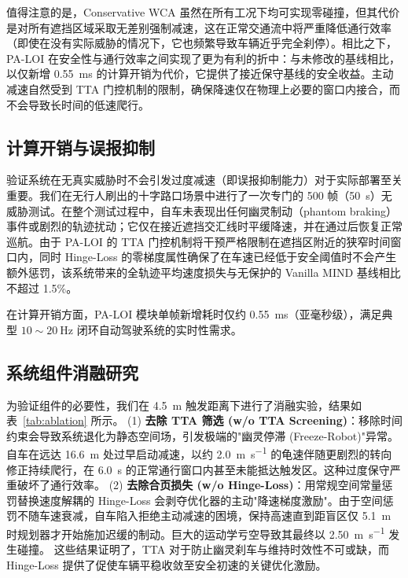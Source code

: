 \documentclass[conference]{IEEEtran}
\begin{document}
值得注意的是，Conservative WCA 虽然在所有工况下均可实现零碰撞，但其代价是对所有遮挡区域采取无差别强制减速，这在正常交通流中将严重降低通行效率（即使在没有实际威胁的情况下，它也频繁导致车辆近乎完全刹停）。相比之下，PA-LOI 在安全性与通行效率之间实现了更为有利的折中：与未修改的基线相比，以仅新增 \SI{0.55}{\milli\second} 的计算开销为代价，它提供了接近保守基线的安全收益。主动减速自然受到 TTA 门控机制的限制，确保降速仅在物理上必要的窗口内接合，而不会导致长时间的低速爬行。



\subsection{计算开销与误报抑制}
验证系统在无真实威胁时不会引发过度减速（即误报抑制能力）对于实际部署至关重要。我们在无行人刷出的十字路口场景中进行了一次专门的 500 帧（\SI{50}{\second}）无威胁测试。在整个测试过程中，自车未表现出任何幽灵制动（phantom braking）事件或剧烈的轨迹扰动；它仅在接近遮挡交汇线时平缓降速，并在通过后恢复正常巡航。由于 PA-LOI 的 TTA 门控机制将干预严格限制在遮挡区附近的狭窄时间窗口内，同时 Hinge-Loss 的零梯度属性确保了在车速已经低于安全阈值时不会产生额外惩罚，该系统带来的全轨迹平均速度损失与无保护的 Vanilla MIND 基线相比不超过 1.5\%。

在计算开销方面，PA-LOI 模块单帧新增耗时仅约 \SI{0.55}{\milli\second}（亚毫秒级），满足典型 $10\sim\SI{20}{\hertz} $ 闭环自动驾驶系统的实时性需求。

\subsection{系统组件消融研究}
为验证组件的必要性，我们在 \SI{4.5}{\meter} 触发距离下进行了消融实验，结果如表~\ref{tab:ablation} 所示。
(1) \textbf{去除 TTA 筛选 (w/o TTA Screening)}：移除时间约束会导致系统退化为静态空间场，引发极端的"幽灵停滞 (Freeze-Robot)"异常。自车在远达 \SI{16.6}{\meter} 处过早启动减速，以约 \SI{2.0}{\meter\per\second} 的龟速伴随更剧烈的转向修正持续爬行，在 \SI{6.0}{\second} 的正常通行窗口内甚至未能抵达触发区。这种过度保守严重破坏了通行效率。
(2) \textbf{去除合页损失 (w/o Hinge-Loss)}：用常规空间常量惩罚替换速度解耦的 Hinge-Loss 会剥夺优化器的主动"降速梯度激励"。由于空间惩罚不随车速衰减，自车陷入拒绝主动减速的困境，保持高速直到距盲区仅 \SI{5.1}{\meter} 时规划器才开始施加迟缓的制动。巨大的运动学亏空导致其最终以 \SI{2.50}{\meter\per\second} 发生碰撞。
这些结果证明了，TTA 对于防止幽灵刹车与维持时效性不可或缺，而 Hinge-Loss 提供了促使车辆平稳收敛至安全初速的关键优化激励。
\end{document}
